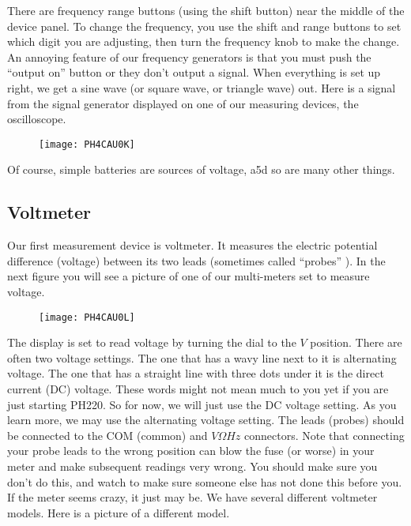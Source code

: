 There are frequency range buttons (using the shift button) near the middle of the device panel. To change the frequency, you use the shift and range buttons to set which digit you are adjusting, then turn the frequency knob to make the change. An annoying feature of our frequency generators is that you must push the ``output on'' button or they don't output a signal. When everything is set up right, we get a sine wave (or square wave, or triangle wave) out. Here is a signal from the signal generator displayed on one of our measuring devices, the
oscilloscope. 

\begin{figure}[h!]
    \centering
    \texttt{[image: PH4CAU0K]}
\end{figure}

Of course, simple batteries are sources of voltage, a5d so are many other things.

\subsection{Voltmeter}

Our first measurement device is voltmeter. It measures the electric potential difference (voltage) between its two leads (sometimes called ``probes'' ). In the next figure you will see a picture of one of our multi-meters set to measure voltage.

\begin{figure}[h!]
	\centering
	\texttt{[image: PH4CAU0L]}
\end{figure}

The display is set to read voltage by turning the dial to the $\unit{V}$ position. There are often two voltage settings. The one that has a wavy line next to it is alternating voltage. The one that has a straight line with three dots under it is the direct current (DC) voltage. These words might not mean much to you yet if you are just starting PH220. So for now, we will just use the DC voltage setting. As you learn more, we may use the alternating voltage setting. The leads (probes) should be connected to the COM (common) and $\unit{V}\unit{\Omega}\unit{Hz}$ connectors. Note that connecting your probe leads to the wrong position can blow the fuse (or worse) in your meter and make subsequent readings very wrong. You should make sure you don't do this, and watch to make sure someone else has not done this before you. If the meter seems crazy, it just may be. We have several different voltmeter models. Here is a picture of a different model.

